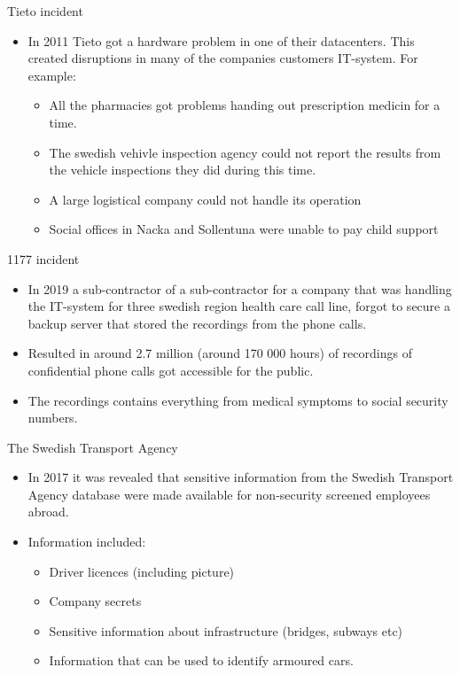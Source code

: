 \documentclass{beamer}
\begin{document}
\begin{frame}{Tieto incident}
  \begin{itemize}
    \item In 2011 Tieto got a hardware problem in one of their datacenters. This
      created disruptions in many of the companies customers IT-system. For
      example: 
      \begin{itemize}
        \item All the pharmacies got problems handing out prescription medicin for a
          time.
        \item The swedish vehivle inspection agency could not report the results
          from the vehicle inspections they did during this time.
        \item A large logistical company could not handle its operation
        \item Social offices in Nacka and Sollentuna were unable to pay child
          support
      \end{itemize}
  \end{itemize}
\end{frame}
\begin{frame}{1177 incident}
  \begin{itemize}
    \item In 2019 a sub-contractor of a sub-contractor for a company that was
      handling the IT-system for three swedish region health care call line,
      forgot to secure a backup server that stored the recordings from the phone
      calls.
    \item Resulted in around 2.7 million (around 170 000 hours) of recordings of
      confidential phone calls got accessible for the public.
    \item The recordings contains everything from medical symptoms to social
      security numbers.
  \end{itemize}
\end{frame}
\begin{frame}{The Swedish Transport Agency}
  \begin{itemize}
    \item In 2017 it was revealed that sensitive information from the Swedish
      Transport Agency database were made available for non-security screened
      employees abroad. 
    \item Information included:
      \begin{itemize}
        \item Driver licences (including picture)
        \item Company secrets
        \item Sensitive information about infrastructure (bridges, subways etc)
        \item Information that can be used to identify armoured cars.
      \end{itemize}
  \end{itemize}
\end{frame}
\end{document}

